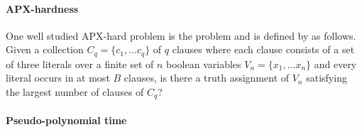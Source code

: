 			\paragraph{APX-hardness}
				\label{par:m3sat}
				One well studied APX-hard problem is the \msat{} problem and is defined by \textcite{papadimitriou1991optimization} as follows.
				Given a collection $C_q = \{c_1, \ldots c_q\}$ of $q$ clauses where each clause consists of a set of three literals over a finite set of $n$ boolean variables $V_n = \{x_1, \ldots x_n\}$ and every literal occurs in at most $B$ clauses, is there a truth assignment of $V_n$ satisfying the largest number of clauses of $C_q$?
	
			\paragraph{Pseudo-polynomial time}

